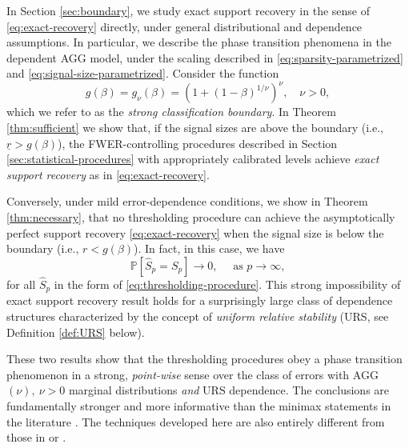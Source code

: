 \medskip


In Section \ref{sec:boundary}, we study exact support recovery in the sense of \eqref{eq:exact-recovery} directly, under general distributional and dependence assumptions. 
In particular, we describe the phase transition phenomena in the dependent AGG model, under the scaling described in \eqref{eq:sparsity-parametrized} and \eqref{eq:signal-size-parametrized}.
Consider the function
\begin{equation} \label{eq:strong-classification-boundary}
    g(\beta) = g_\nu(\beta) = (1 + (1 - \beta)^{1/\nu})^\nu, \quad \nu>0,
\end{equation}
which we refer to as the {\em strong classification boundary}.
In Theorem \ref{thm:sufficient} we show that, 
if the signal sizes are above the boundary (i.e., $\underline{r}> g(\beta)$), the \ac{FWER}-controlling procedures described in Section \ref{sec:statistical-procedures} with appropriately calibrated levels achieve \emph{exact support recovery} as in \eqref{eq:exact-recovery}.

Conversely, under mild error-dependence conditions, we show in Theorem \ref{thm:necessary}, that
no thresholding procedure can achieve the asymptotically perfect support recovery \eqref{eq:exact-recovery}
when the signal size is below the boundary  (i.e., $r<g(\beta)$).   In fact, in this case, we have
\begin{equation} \label{eq:exact-recovery-failure}
    \mathbb{P}\left[\widehat{S}_p=S_p\right]\longrightarrow 0,\quad \mbox{ as }p\to \infty,
\end{equation}
for all $\widehat{S}_p$ in the form of \eqref{eq:thresholding-procedure}.  This strong 
impossibility of exact support recovery result holds for a surprisingly large class of dependence structures 
characterized by the concept of \emph{uniform relative stability} (URS, see Definition \ref{def:URS} below). 

These two results show that the thresholding procedures obey a phase transition phenomenon in a strong, 
\emph{point-wise} sense over the class of errors with AGG$(\nu),\ \nu>0$ marginal distributions {\em and} URS 
dependence. The conclusions are fundamentally stronger and more informative than the minimax statements in the literature \citep[see, e.g.,][]{butucea2018variable}.
The techniques developed here are also entirely different from those in \citet{ji2012ups} or \citet{butucea2018variable}.

